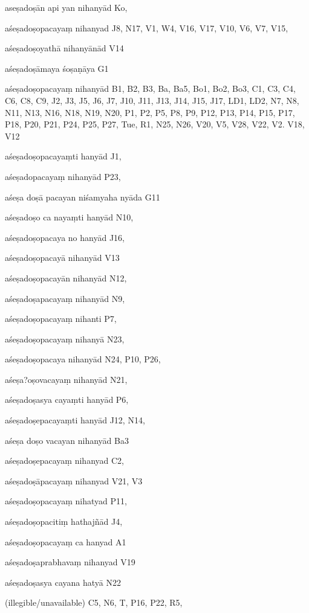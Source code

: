 \begin{ekdosis}
\begin{marma}[hp01_055]
\begin{marma}[hp02_009]
\begin{marma}[hp02_011]
 \begin{marma}[hp02_29c]
\item[aseṣadoṣān api yan nihanyād] Ko, 
\item[aśeṣadoṣopacayaṃ nihanyad] J8, N17, V1, W4, V16, V17, V10, V6, V7, V15, 
\item[aśeṣadoṣoyathā nihanyānād] V14
\item[aśeṣadoṣāmaya śoṣaṇāya] G1
\item[aśeṣadoṣopacayaṃ nihanyād] B1, B2, B3, Ba, Ba5, Bo1, Bo2, Bo3, C1, C3, C4, C6, C8, C9, J2, J3, J5, J6, J7, J10, J11, J13, J14, J15, J17, LD1, LD2, N7, N8, N11, N13, N16, N18, N19, N20, P1, P2, P5, P8, P9, P12, P13, P14, P15, P17, P18, P20, P21, P24, P25, P27, Tue, R1, N25, N26, V20, V5, V28, V22, V2. V18, V12
\item[aśeṣadoṣopacayaṃti hanyād] J1,
\item[aśeṣadopacayaṃ nihanyād] P23,
\item[aśeṣa doṣā pacayan niśamyaha nyāda] G11
\item[aśeṣadoṣo ca nayaṃti hanyād] N10,
\item[aśeṣadoṣopacaya no hanyād] J16,
\item[aśeṣadoṣopacayā nihanyād] V13
\item[aśeṣadoṣopacayān nihanyād] N12,
\item[aśeṣadoṣapacayaṃ nihanyād] N9,
\item[aśeṣadoṣopacayaṃ nihanti] P7, 
\item[aśeṣadoṣopacayaṃ nihanyā] N23,
\item[aśeṣadoṣopacaya nihanyād] N24, P10, P26, 
\item[aśeṣa?oṣovacayaṃ nihanyād] N21,
\item[aśeṣadoṣasya cayaṃti hanyād] P6,
\item[aśeṣadoṣepacayaṃti hanyād] J12, N14, 
\item[aśeṣa doṣo vacayan nihanyād] Ba3
\item[aśeṣadoṣepacayaṃ nihanyad] C2,
\item[aśeṣadoṣāpacayaṃ nihanyad] V21, V3
\item[aśeṣadoṣopacayaṃ nihatyad] P11, 
\item[aśeṣadoṣopacitiṃ hathajñād] J4,
\item[aśeṣadoṣopacayaṃ ca hanyad] A1
\item[aśeṣadoṣaprabhavaṃ nihanyad] V19
\item[aśeṣadoṣasya cayana hatyā] N22
\item[(illegible/unavailable)] C5, N6, T, P16, P22, R5,
  \begin{description}


\end{description}
\end{marma}
\end{marma}
\end{marma}
\end{marma}
\end{ekdosis}
